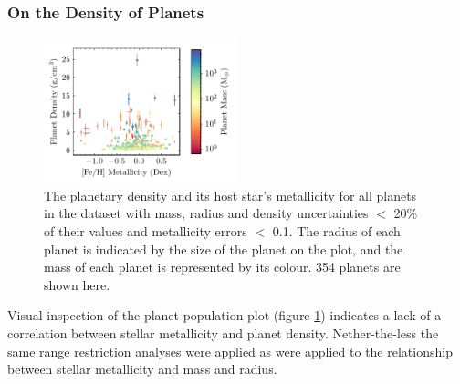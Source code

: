 \documentclass[a4paper,twocolumn,12pt]{article}
\begin{document}








\subsubsection{On the Density of Planets}

\begin{figure}[h!]
    \centering
    \includegraphics[width=0.5\textwidth]{Graphs/FeH vs Density Planet Plot.pdf}
    \caption{The planetary density and its host star's metallicity for all planets in the dataset with mass, radius and density uncertainties $<$ 20\% of their values and metallicity errors $<$ 0.1. The radius of each planet is indicated by the size of the planet on the plot, and the mass of each planet is represented by its colour. 354 planets are shown here.}
    \label{figure: Fe/H vs density parameter plot}
\end{figure}

Visual inspection of the planet population plot (figure \ref{figure: Fe/H vs density parameter plot}) indicates a lack of a correlation between stellar metallicity and planet density. Nether-the-less the same range restriction analyses were applied as were applied to the relationship between stellar metallicity and mass and radius.
\end{document}
